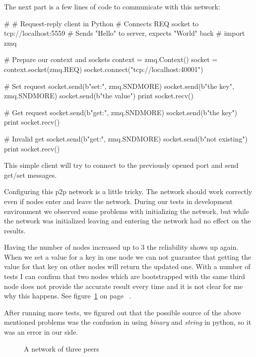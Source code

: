The next part is a few lines of code to communicate with this network:

\begin{python}
#
# Request-reply client in Python
# Connects REQ socket to tcp://localhost:5559
# Sends "Hello" to server, expects "World" back
#
import zmq

# Prepare our context and sockets
context = zmq.Context()
socket = context.socket(zmq.REQ)
socket.connect("tcp://localhost:40001")

# Set request
socket.send(b"set:", zmq.SNDMORE)
socket.send(b"the key", zmq.SNDMORE)
socket.send(b"the value")
print socket.recv()

# Get request
socket.send(b"get:", zmq.SNDMORE)
socket.send(b"the key")
print socket.recv()

# Invalid get
socket.send(b"get:", zmq.SNDMORE)
socket.send(b"not existing")
print socket.recv()
\end{python}

This simple client will try to connect to the previously opened port and send get/set messages.

Configuring this p2p network is a little tricky. The network should work correctly even if nodes enter
and leave the network. During our tests in development environment we observed some problems with initializing the network,
but while the network was initialized leaving and entering the network had no effect on the results.

Having the number of nodes increased up to 3 the reliability shows up again. When we set a value for a key 
in one node we can not guarantee that getting the value for that key on other nodes will return the updated one.
With a number of tests I can confirm that two nodes which are bootstrapped with the same third node does not
provide the accurate result every time and it is not clear for me why this happens. See figure~\ref{fig:threepeers} on page ~\pageref{fig:threepeers}.

After running more tests, we figured out that the possible source of the above mentioned problems 
was the confusion in using \textit{binary} and \textit{string} in python, so it was an error in our side.

\begin{figure}
\centering
{}
\caption{A network of three peers}
\label{fig:threepeers}
\end{figure}


